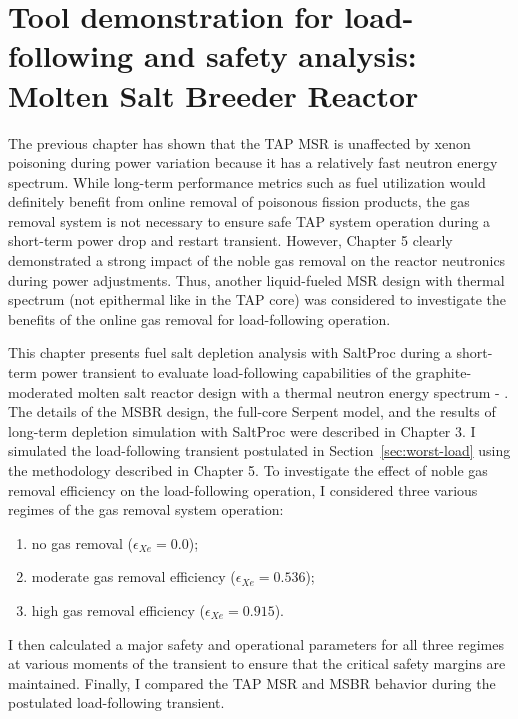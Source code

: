 \chapter{Tool demonstration for load-following and safety analysis: Molten 
Salt Breeder Reactor}
The previous chapter has shown that the \gls{TAP} \gls{MSR} is unaffected by
xenon poisoning during power variation because it has a relatively 
fast neutron energy spectrum. 
While long-term performance metrics such as fuel utilization would definitely 
benefit from online removal of poisonous fission products, the gas removal 
system is not necessary to ensure safe \gls{TAP} system operation during a
short-term power drop and restart transient. 
However, Chapter 5 clearly demonstrated a strong impact of the noble gas 
removal on the reactor neutronics during power adjustments. Thus, another 
liquid-fueled \gls{MSR} design with thermal spectrum (not epithermal like in 
the \gls{TAP} core) was considered to investigate the benefits of the 
online gas removal for load-following operation.	

This chapter presents fuel salt depletion analysis with SaltProc during a
short-term power transient to evaluate load-following capabilities of the 
graphite-moderated molten salt reactor design with a thermal neutron energy 
spectrum - . The details of the \gls{MSBR} design, the 
full-core Serpent model, and the results of long-term depletion simulation 
with SaltProc were described in Chapter 3. I simulated the load-following 
transient postulated in Section~\ref{sec:worst-load} using the methodology 
described in Chapter 5. 
To investigate the effect of noble gas removal efficiency on the 
load-following operation, I considered three various regimes of the gas 
removal system operation:
\begin{enumerate}[label=(\alph*), noitemsep, topsep=0pt]
	\item no gas removal ($\epsilon_{Xe}=0.0$);
	\item moderate gas removal efficiency ($\epsilon_{Xe}=0.536$);
	\item high gas removal efficiency ($\epsilon_{Xe}=0.915$).
\end{enumerate}
I then calculated a major safety and operational parameters for all three 
regimes at various moments of the transient to ensure that the critical 
safety margins are maintained. Finally, I compared the \gls{TAP} \gls{MSR} and 
\gls{MSBR} behavior during the postulated load-following transient.


